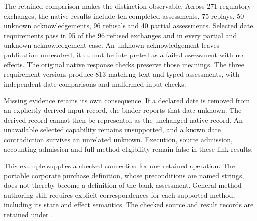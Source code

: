 The retained comparison makes the distinction observable. Across 271 regulatory
exchanges, the native results include ten completed assessments, 75 replays,
50 unknown acknowledgements, 96 refusals and 40 partial assessments. Selected
date requirements pass in 95 of the 96 refused exchanges and in every partial
and unknown-acknowledgement case. An unknown acknowledgement leaves publication
unresolved; it cannot be interpreted as a failed assessment with no effects.
The original native response checks preserve those meanings. The three
requirement versions produce 813 matching text and typed assessments, with
independent date comparisons and malformed-input checks.

Missing evidence retains its own consequence. If a declared date is removed
from an explicitly derived input record, the binder reports that date unknown.
The derived record cannot then be represented as the unchanged native record.
An unavailable selected capability remains unsupported, and a known date
contradiction survives an unrelated unknown. Execution, source admission,
accounting admission and full method eligibility remain false in these link
results.

This example supplies a checked connection for one retained operation. The
portable corporate purchase definition, whose preconditions are named strings,
does not thereby become a definition of the bank assessment. General method
authoring still requires explicit correspondences for each supported method,
including its state and effect semantics. The checked source and result records
are retained under
.
